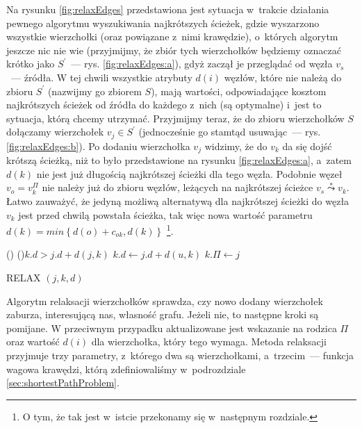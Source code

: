 Na rysunku \ref{fig:relaxEdges} przedstawiona jest sytuacja w~trakcie działania pewnego algorytmu wyszukiwania najkrótszych ścieżek, gdzie wyszarzono wszystkie wierzchołki (oraz powiązane z~nimi krawędzie), o~których algorytm jeszcze nic nie wie (przyjmijmy, że zbiór tych wierzchołków będziemy oznaczać krótko jako $S^{'}$~---  rys. \ref{fig:relaxEdges:a}), gdyż zaczął je przeglądać od węzła $v_{s}$~---  źródła. W tej chwili wszystkie atrybuty $d \left( i \right)$ węzłów, które nie należą do zbioru $S^{'}$ (nazwijmy go zbiorem $S$), mają wartości, odpowiadające kosztom najkrótszych ścieżek od źródła do każdego z~nich (są optymalne) i~jest to sytuacja, którą chcemy utrzymać. Przyjmijmy teraz, że do zbioru wierzchołków $S$ dołączamy wierzchołek $v_{j} \in S^{'}$ (jednocześnie go stamtąd usuwając~---  rys. \ref{fig:relaxEdges:b}). Po dodaniu wierzchołka $v_{j}$ widzimy, że do $v_{k}$ da się dojść krótszą ścieżką, niż to było przedstawione na rysunku \ref{fig:relaxEdges:a}, a~zatem $d \left( k \right)$ nie jest już długością najkrótszej ścieżki dla tego węzła. Podobnie węzeł $v_{o} = v_{k}^{\Pi}$ nie należy już do zbioru węzłów, leżących na najkrótszej ścieżce $v_{s} \overset{*}\leadsto v_{k}$. Łatwo zauważyć, że jedyną możliwą alternatywą dla najkrótszej ścieżki do węzła $v_{k}$ jest przed chwilą powstała ścieżka, tak więc nowa wartość parametru $d \left( k \right) = min \left\{ d \left( o \right) + c_{ok}, d \left( k \right) \right\} $ \footnote{O tym, że tak jest w~istcie przekonamy się w~następnym rozdziale.}.

\begin{algorithm}[!htbp]
\DontPrintSemicolon
\Begin(){
	\If(){$ k.d > j.d + d \left( j, k \right)$} {
		$ k.d \longleftarrow j.d + d \left( u, k \right)$ \;
		$ k.\Pi \longleftarrow j$ \;
	}
}
\caption{RELAX $\left( j, k, d \right)$ \label{alg:relax}}
\end{algorithm}

Algorytm relaksacji wierzchołków sprawdza, czy nowo dodany wierzchołek zaburza, interesującą nas, własność grafu. Jeżeli nie, to następne kroki są pomijane. W przeciwnym przypadku aktualizowane jest wskazanie na rodzica $\Pi$ oraz wartość $d \left( i \right)$  dla wierzchołka, który tego wymaga. Metoda relaksacji przyjmuje trzy parametry, z~którego dwa są wierzchołkami, a~trzecim~--- funkcja wagowa krawędzi, którą zdefiniowaliśmy w~podrozdziale \ref{sec:shortestPathProblem}.

